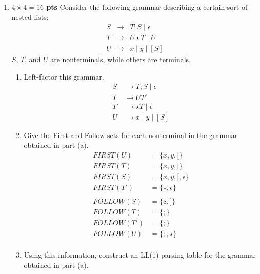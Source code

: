 \documentclass[10pt]{article}
\newcommand {\pts}[1]{{\bf #1 pts}}
\begin{document}
\begin{enumerate}
\newpage
\item \pts{$4\times 4 =16$} Consider the following grammar describing a certain sort of nested lists:
\[\begin{array}{cll}
S & \rightarrow & T;S \mid \epsilon \\
T & \rightarrow & U\star T \mid U \\
U & \rightarrow & x\mid y\mid [S]
\end{array}\]
$S$, $T$, and $U$ are nonterminals, while others are terminals.
\begin{enumerate}
  \item Left-factor this grammar.
               \[
                \begin{array}{cll}
                  S   &\rightarrow T;S \mid \epsilon      \\
                  T   &\rightarrow UT'                    \\
                  T'  &\rightarrow \star T \mid \epsilon  \\
                  U   &\rightarrow x\mid y\mid [S]
                \end{array}
            \]
  \item Give the First and Follow sets for each nonterminal in the grammar obtained in part (a).
               \[
            \begin{array}{cll}
            FIRST(U)    &= \{x, y, [\}          \\
            FIRST(T)    &= \{x, y, [\}          \\
            FIRST(S)    &= \{x, y, [, \epsilon\}\\
            FIRST(T')   &= \{\star, \epsilon\}  \\
            \\
            FOLLOW(S)   &= \{\$, ]\}    \\
            FOLLOW(T)   &= \{;\}        \\
            FOLLOW(T')  &= \{;\}        \\
            FOLLOW(U)   &= \{;, \star\}  \\
          \end{array}
            \]
  \item Using this information, construct an LL(1) parsing table for the grammar obtained in part (a).\\
  \begin{table}[h!]
    \centering
      \begin{tabular}{|c|c|c|c|c|c|c|c|}

\end{tabular}
\end{table}
\end{enumerate}
\end{enumerate}
\end{document}
